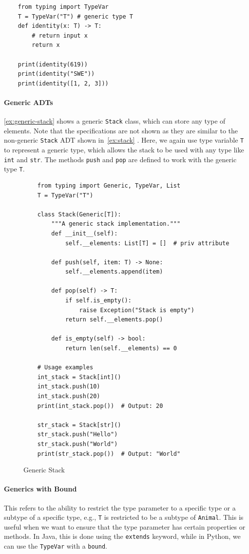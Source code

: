 \documentclass[oneside,11pt,dvipsnames]{book}
\newcommand{\code}[1]{\texttt{#1}}
\begin{document}
\begin{lstlisting}
    from typing import TypeVar
    T = TypeVar("T") # generic type T
    def identity(x: T) -> T:
        # return input x
        return x

    print(identity(619))
    print(identity("SWE"))
    print(identity([1, 2, 3]))
\end{lstlisting}

\paragraph{Generic ADTs}  \autoref{ex:generic-stack} shows a generic \code{Stack} class, which can store any type of elements. Note that the specifications are not shown as they are similar to the non-generic \code{Stack} ADT shown in~\autoref{ex:stack} .
Here, we again use type variable \code{T} to represent a generic type, which allows the stack to be used with any type like \code{int} and \code{str}. The methods \code{push} and \code{pop} are defined to work with the generic type \code{T}.

\begin{figure}
\begin{lstlisting}
    from typing import Generic, TypeVar, List
    T = TypeVar("T")
    
    class Stack(Generic[T]):
        """A generic stack implementation."""
        def __init__(self):
            self.__elements: List[T] = []  # priv attribute 

        def push(self, item: T) -> None:
            self.__elements.append(item)
    
        def pop(self) -> T:
            if self.is_empty():
                raise Exception("Stack is empty")
            return self.__elements.pop()
    
        def is_empty(self) -> bool:
            return len(self.__elements) == 0
    
    # Usage examples
    int_stack = Stack[int]()
    int_stack.push(10)
    int_stack.push(20)
    print(int_stack.pop())  # Output: 20
    
    str_stack = Stack[str]()
    str_stack.push("Hello")
    str_stack.push("World")
    print(str_stack.pop())  # Output: "World"
\end{lstlisting}
\caption{Generic Stack}\label{ex:generic-stack}
\end{figure}

\paragraph{Generics with Bound} This refers to the ability to restrict the type parameter to a specific type or a subtype of a specific type, e.g., \code{T} is restricted to be a subtype of \code{Animal}. This is useful when we want to ensure that the type parameter has certain properties or methods. In Java, this is done using the \texttt{extends} keyword, while in Python, we can use the \texttt{TypeVar} with a \code{bound}.
\end{document}
